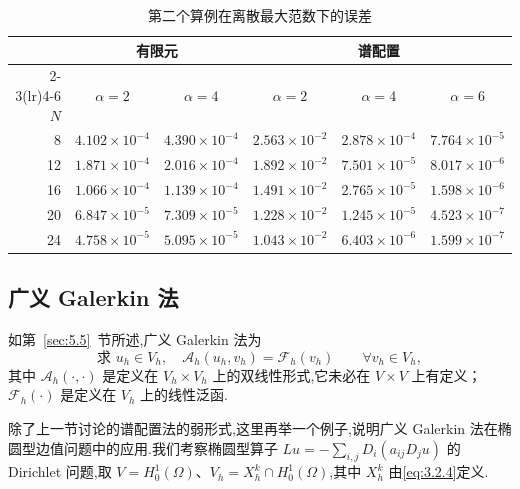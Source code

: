 \begin{table}[htbp]
  \centering
  \caption{第二个算例在离散最大范数下的误差}\label{tab:6.2.2}
  \begin{tabular}{rccccc}
    \toprule
    &\multicolumn{2}{c}{有限元}&\multicolumn{3}{c}{谱配置}\\
    \cmidrule(lr){2-3}\cmidrule(lr){4-6}
    \(N\)&\(\alpha=2\)&\(\alpha=4\)&\(\alpha=2\)&\(\alpha=4\)&\(\alpha=6\)\\
    \midrule
    8  & \(4.102\times10^{-4}\) & \(4.390\times10^{-4}\) & \(2.563\times10^{-2}\) & \(2.878\times10^{-4}\) & \(7.764\times10^{-5}\)\\
    12 & \(1.871\times10^{-4}\) & \(2.016\times10^{-4}\) & \(1.892\times10^{-2}\) & \(7.501\times10^{-5}\) & \(8.017\times10^{-6}\)\\
    16 & \(1.066\times10^{-4}\) & \(1.139\times10^{-4}\) & \(1.491\times10^{-2}\) & \(2.765\times10^{-5}\) & \(1.598\times10^{-6}\)\\
    20 & \(6.847\times10^{-5}\) & \(7.309\times10^{-5}\) & \(1.228\times10^{-2}\) & \(1.245\times10^{-5}\) & \(4.523\times10^{-7}\)\\
    24 & \(4.758\times10^{-5}\) & \(5.095\times10^{-5}\) & \(1.043\times10^{-2}\) & \(6.403\times10^{-6}\) & \(1.599\times10^{-7}\)\\
    \bottomrule
  \end{tabular}
\end{table}

\subsection{广义 Galerkin 法}\label{sec:6.2.3}

如第~\ref{sec:5.5}~节所述,广义 Galerkin 法为
\begin{equation}\label{eq:6.2.41}
  \text{求 }u_h\in V_h,\quad
   \mathcal A_h(u_h,v_h)=\mathcal F_h(v_h)\qquad\forall v_h\in V_h,
\end{equation}
其中 \(\mathcal A_h(\cdot,\cdot)\) 是定义在 \(V_h\times V_h\) 上的双线性形式,它未必在 \(V\times V\) 上有定义；\(\mathcal F_h(\cdot)\) 是定义在 \(V_h\) 上的线性泛函.

除了上一节讨论的谱配置法的弱形式,这里再举一个例子,说明广义 Galerkin 法在椭圆型边值问题中的应用.我们考察椭圆型算子 \(Lu=-\sum_{i,j}D_i(a_{ij}D_j u)\) 的 Dirichlet 问题,取 \(V=H_0^1(\Omega)\)、\(V_h=X_h^k\cap H_0^1(\Omega)\),其中 \(X_h^k\) 由\eqref{eq:3.2.4}定义.

